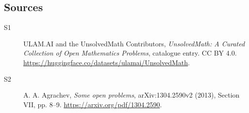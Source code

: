 \documentclass[11pt]{article}
\begin{document}
\subsection{Sources}
\begin{description}
\item[\hypertarget{source:statement:1}{S1}] ULAM.AI and the UnsolvedMath Contributors, \emph{UnsolvedMath: A Curated Collection of Open Mathematics Problems}, catalogue entry. CC BY 4.0. \url{https://huggingface.co/datasets/ulamai/UnsolvedMath}.
\item[\hypertarget{source:statement:2}{S2}] A. A. Agrachev, \emph{Some open problems}, arXiv:1304.2590v2 (2013), Section VII, pp. 8--9. \url{https://arxiv.org/pdf/1304.2590}.
\end{description}
\label{end:statement}
\end{document}
